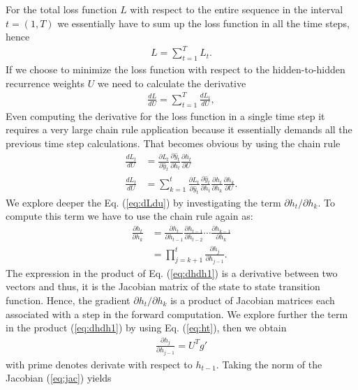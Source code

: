 \documentclass[12pt,letterpaper]{article}
\begin{document}
For the total loss  function $L$ with respect to the entire sequence in the interval $t=(1,T)$ we essentially have to sum up the loss function in all the time steps, hence
\begin{align}
\label{eq:L}
L = \sum_{t=1}^T L_t.
\end{align}
If we choose to minimize the loss function with respect to the hidden-to-hidden recurrence weights  $U$ we need to calculate the derivative 
\begin{align}
\label{eq:dL}
\frac{d L}{d U} = \sum_{t=1}^T  \frac{d L_t}{d U},
\end{align}
%
Even computing the derivative for the loss function in a single time step it requires a very large chain rule application because it essentially demands all the previous time step calculations. That becomes obvious by using the chain rule
\begin{align}
\frac{d L_t}{d U}  & = \frac{\partial L_t}{\partial \hat y_t} \frac{\partial \hat y_t}{\partial h_t}\frac{\partial h_t}{\partial U} \nonumber \\
\label{eq:dLdu}
\frac{d L_t}{d U}  & = \sum_{k=1}^t \frac{\partial L_t}{\partial \hat y_t} \frac{\partial \hat y_t}{\partial h_t}\frac{\partial h_t}{\partial h_k}\frac{\partial h_k}{\partial U}.
\end{align}
We explore deeper the Eq. (\ref{eq:dLdu}) by investigating the term ${\partial h_t}/{\partial h_k}$. To compute this term we have to use the chain rule again as:
\begin{align}
\frac{\partial h_t}{\partial h_k} &= \frac{\partial h_t}{\partial h_{t-1}}\frac{\partial h_{t-1}}{\partial h_{t-2}} \cdots \frac{\partial h_{k-1}}{\partial h_{k}} \nonumber \\
\label{eq:dhdh1}
&=\prod_{j=k+1}^t \frac{\partial h_j}{\partial h_{j-1} }.
\end{align}
The expression in the product of Eq. (\ref{eq:dhdh1}) is a derivative between two vectors and thus, it is the Jacobian matrix of the state to state transition function. Hence, the gradient ${\partial h_t}/{\partial h_k}$ is a product of Jacobian matrices each associated with a step in the forward computation. We explore further the term in the product (\ref{eq:dhdh1}) by using Eq. (\ref{eq:ht}), then we obtain
\begin{align}
\label{eq:jac}
\frac{\partial h_j}{\partial h_{j-1} } = U^T g'
\end{align}
with prime denotes derivate with respect to $h_{t-1}$. Taking the norm of the Jacobian (\ref{eq:jac}) yields
\end{document}
